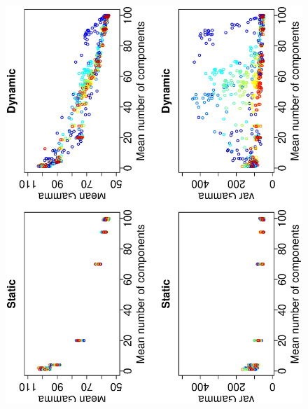 \documentclass[12pt]{article}
\begin{document}
\begin{figure}[hb!]
\hspace{-0.5 in}\includegraphics[width=5in,angle=-90]{./figures/mean_variance_comp_gamma.eps}
\caption{}
\label{fig:Figure5}
\end{figure}
\end{document}
